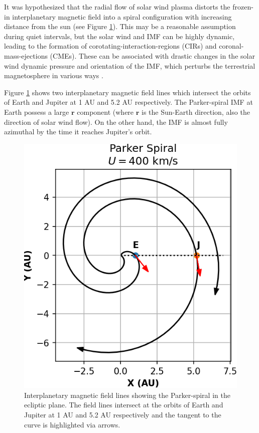 It was hypothesized that the radial flow of solar wind plasma distorts the frozen-in interplanetary magnetic field into a spiral configuration with increasing distance from the sun \cite{Parker1958DynamicsFields.,Ness1964SolarField} (see Figure \ref{fig:parker-spiral}). This may be a reasonable assumption during quiet intervals, but the solar wind and IMF can be highly dynamic, leading to the formation of corotating-interaction-regions (CIRs) and coronal-mass-ejections (CMEs). These can be associated with drastic changes in the solar wind dynamic pressure and orientation of the IMF, which perturbs the terrestrial magnetosphere in various ways \cite{Borovsky2006DifferencesStorms,Denton2006GeomagneticWind}. 

Figure \ref{fig:parker-spiral} shows two interplanetary magnetic field lines which intersect the orbits of Earth and Jupiter at 1 AU and 5.2 AU respectively. The Parker-spiral IMF at Earth possess a large $\mathbf{r}$ component (where $\mathbf{r}$ is the Sun-Earth direction, also the direction of solar wind flow). On the other hand, the IMF is almost fully azimuthal by the time it reaches Jupiter's orbit.

\begin{figure}
    \centering
    \includegraphics{images1/parker-spiral.png}
    \caption{Interplanetary magnetic field lines showing the Parker-spiral in the ecliptic plane. The field lines intersect at the orbits of Earth and Jupiter at 1 AU and 5.2 AU respectively and the tangent to the curve is highlighted via arrows.}
    \label{fig:parker-spiral}
\end{figure}


